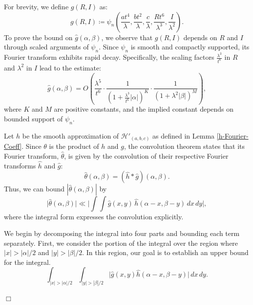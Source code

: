 \documentclass{article}
\newenvironment{proof}{\noindent {\bf Proof:}}{$\Box$ \vspace{2 ex}}
\begin{document}
\begin{proof} For brevity, we define $g(R, I)$ as: \begin{equation*} g(R,I) \coloneqq \psi_{n} \left(\frac{a t^4}{\lambda}, \frac{b t^2}{\lambda}, \frac{c}{\lambda}, \frac{R t^6}{\lambda^3}, \frac{I}{\lambda^2}\right). \end{equation*} 
To prove the bound on $\widehat{g}(\alpha, \beta)$, we observe that $g(R, I)$ depends on $R$ and $I$ through scaled arguments of $\psi_n$. Since $\psi_n$ is smooth and compactly supported, its Fourier transform exhibits rapid decay. Specifically, the scaling factors $\frac{\lambda^3}{t^6}$ in $R$ and $\lambda^2$ in $I$ lead to the estimate:
\begin{equation*} \widehat{g}(\alpha, \beta) = O\left(\frac{\lambda^5}{t^6} \cdot \frac{1}{\left(1 + \frac{\lambda^3}{t^6} |\alpha|\right)^K} \cdot \frac{1}{\left(1 + \lambda^2 |\beta|\right)^M}\right), 
\end{equation*}
where $K$ and $M$ are positive constants, and the implied constant depends on bounded support of $\psi_n$.

Let $h$ be the smooth approximation of $\mathcal{H}'_{(a, b, c)}$ as defined in Lemma \ref{h-Fourier-Coeff}. Since $\theta$ is the product of $h$ and $g$, the convolution theorem states that its Fourier transform, $\widehat{\theta}$, is given by the convolution of their respective Fourier transforms $\widehat{h}$ and $\widehat{g}$: 
\begin{equation*} \widehat{\theta}(\alpha, \beta) = (\widehat{h} * \widehat{g})(\alpha, \beta). \end{equation*} 
Thus, we can bound $|\widehat{\theta}(\alpha, \beta)|$ by 
\begin{equation*} \big|\widehat{\theta}(\alpha, \beta)\big| \ll \Big|\int \int \widehat{g}(x, y) \, \widehat{h}(\alpha - x, \beta - y) \, dx \, dy\Big|, \end{equation*} 
where the integral form expresses the convolution explicitly.

We begin by decomposing the integral into four parts and bounding each term separately. First, we consider the portion of the integral over the region where $|x| > |\alpha|/2$ and $|y| > |\beta|/2$. In this region, our goal is to establish an upper bound for the integral.
\begin{equation*}
\int_{|x| > |\alpha|/2} \int_{|y| > |\beta|/2} \big|\widehat{g}(x, y) \widehat{h}(\alpha - x, \beta - y)\big| \, dx \, dy.
\end{equation*}


\end{proof}
\end{document}
